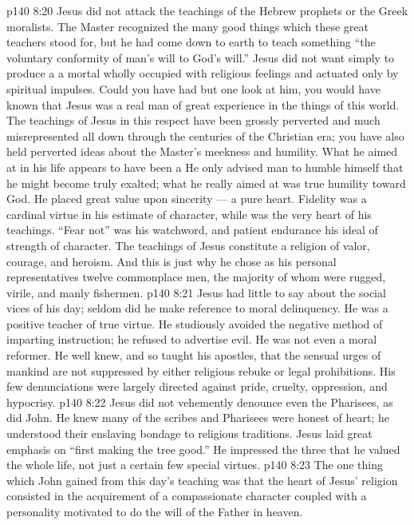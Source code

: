 \vs p140 8:20 Jesus did not attack the teachings of the Hebrew prophets or the Greek moralists. The Master recognized the many good things which these great teachers stood for, but he had come down to earth to teach something  “the voluntary conformity of man’s will to God’s will.” Jesus did not want simply to produce a  a mortal wholly occupied with religious feelings and actuated only by spiritual impulses. Could you have had but one look at him, you would have known that Jesus was a real man of great experience in the things of this world. The teachings of Jesus in this respect have been grossly perverted and much misrepresented all down through the centuries of the Christian era; you have also held perverted ideas about the Master’s meekness and humility. What he aimed at in his life appears to have been a  He only advised man to humble himself that he might become truly exalted; what he really aimed at was true humility toward God. He placed great value upon sincerity --- a pure heart. Fidelity was a cardinal virtue in his estimate of character, while  was the very heart of his teachings. \textcolor{ubdarkred}{“Fear not”} was his watchword, and patient endurance his ideal of strength of character. The teachings of Jesus constitute a religion of valor, courage, and heroism. And this is just why he chose as his personal representatives twelve commonplace men, the majority of whom were rugged, virile, and manly fishermen.
\vs p140 8:21 Jesus had little to say about the social vices of his day; seldom did he make reference to moral delinquency. He was a positive teacher of true virtue. He studiously avoided the negative method of imparting instruction; he refused to advertise evil. He was not even a moral reformer. He well knew, and so taught his apostles, that the sensual urges of mankind are not suppressed by either religious rebuke or legal prohibitions. His few denunciations were largely directed against pride, cruelty, oppression, and hypocrisy.
\vs p140 8:22 Jesus did not vehemently denounce even the Pharisees, as did John. He knew many of the scribes and Pharisees were honest of heart; he understood their enslaving bondage to religious traditions. Jesus laid great emphasis on \textcolor{ubdarkred}{“first making the tree good.”} He impressed the three that he valued the whole life, not just a certain few special virtues.
\vs p140 8:23 \pc The one thing which John gained from this day’s teaching was that the heart of Jesus’ religion consisted in the acquirement of a compassionate character coupled with a personality motivated to do the will of the Father in heaven.

